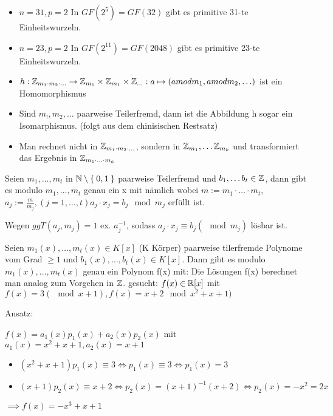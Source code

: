 \documentclass{../tudscript}
\begin{document}
\begin{itemize}
\item $n = 31, p = 2$
    In $GF(2^5) = GF(32)$ gibt es primitive 31-te Einheitswurzeln.
\item $n = 23, p = 2$
  In $GF(2^{11}) = GF(2048)$ gibt es primitive 23-te Einheitswurzeln.
\end{itemize}
\begin{itemize}
\item $h: \mathbb{Z}_{m_1 \cdot m_2 \cdot \ldots} \rightarrow \mathbb{Z}_{m_1} \times \mathbb{Z}_{m_1} \times \mathbb{Z}_{\ldots}: a \mapsto (a mod m_1, a mod m_2, \ldots)$
  ist ein Homomorphismus
\item Sind $m_!, m_2, \ldots$ paarweise Teilerfremd, dann ist die Abbildung h sogar ein Isomarphismus. (folgt aus dem chinisischen Restsatz)
\item Man rechnet nicht in $\mathbb{Z}_{m_1 \cdot m_2 \cdot \ldots}$, sondern in $\mathbb{Z}_{m_1}, \ldots \mathbb{Z}_{m_k}$ und transformiert das Ergebnis in $\mathbb{Z}_{m_1 \cdot \ldots \cdot m_k}$
\end{itemize}
Seien $m_1, \ldots, m_t$ in $\mathbb{N} \setminus \Set{0, 1}$ paarweise Teilerfremd und $b_1,\ldots b_t \in \mathbb{Z}$, dann gibt es modulo $m_1, \ldots, m_t$ genau ein x mit
  nämlich
  wobei $m := m_1 \cdot \ldots \cdot m_t$, $a_j := \frac{m}{m_j}, (j = 1, \ldots, t) a_j \cdot x_j = b_j \mod m_j$ erfüllt ist.

  Wegen $ggT(a_j, m_j) = 1$ ex. $a_{j}^{-1}$, sodass $a_j \cdot x_j \equiv b_j (\mod m_j)$ lösbar ist.

  Seien $m_1(x), \ldots, m_t(x) \in K[x]$ (K Körper) paarweise tilerfremde Polynome vom Grad $\geq 1$ und $b_1(x), \ldots, b_t(x) \in K[x]$.
  Dann gibt es modulo $m_1(x), \ldots, m_t(x)$ genau ein Polynom f(x) mit:
  Die Lösungen f(x) berechnet man analog zum Vorgehen in $\mathbb{Z}$.
  gesucht: $f(x) \in \mathbb{R}[x]$ mit $f(x) = 3 (\mod x + 1), f(x) = x+2 \mod x^2 + x + 1)$


  Ansatz:

  $f(x) = a_1(x) p_1(x) + a_2(x) p_2(x)$ mit $a_1(x) = x^2 + x + 1, a_2(x) = x+ 1$

  \begin{itemize}
  \item $(x^2 + x + 1) p_1 (x) \equiv 3 \iff p_1(x) \equiv 3 \iff p_1(x) = 3$
  \item $(x+1) p_2(x) \equiv x+2 \iff p_2(x) = (x+1)^{-1} (x+2) \iff p_2(x) = -x^2 =2x$
  \end{itemize}
$\implies f(x) = -x^3 + x + 1$
\end{document}
